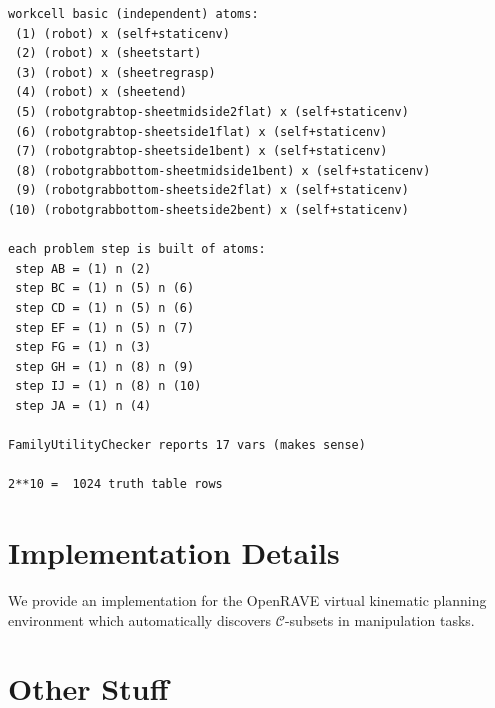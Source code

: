\begin{verbatim}
workcell basic (independent) atoms:
 (1) (robot) x (self+staticenv)
 (2) (robot) x (sheetstart)
 (3) (robot) x (sheetregrasp)
 (4) (robot) x (sheetend)
 (5) (robotgrabtop-sheetmidside2flat) x (self+staticenv)
 (6) (robotgrabtop-sheetside1flat) x (self+staticenv)
 (7) (robotgrabtop-sheetside1bent) x (self+staticenv)
 (8) (robotgrabbottom-sheetmidside1bent) x (self+staticenv)
 (9) (robotgrabbottom-sheetside2flat) x (self+staticenv)
(10) (robotgrabbottom-sheetside2bent) x (self+staticenv)

each problem step is built of atoms:
 step AB = (1) n (2)
 step BC = (1) n (5) n (6)
 step CD = (1) n (5) n (6)
 step EF = (1) n (5) n (7)
 step FG = (1) n (3)
 step GH = (1) n (8) n (9)
 step IJ = (1) n (8) n (10)
 step JA = (1) n (4)

FamilyUtilityChecker reports 17 vars (makes sense)

2**10 =  1024 truth table rows
\end{verbatim}









\section{Implementation Details}

We provide an implementation for the
OpenRAVE \citep{diankov2010openrave}
virtual kinematic planning environment
which automatically discovers $\mathcal{C}$-subsets
in manipulation tasks.




\section{Other Stuff}


